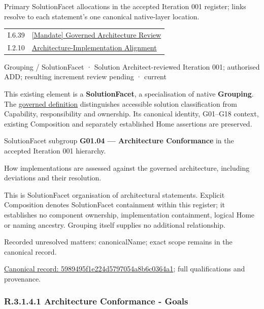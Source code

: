 Primary SolutionFacet allocations in the accepted Iteration 001 register; links resolve to each statement’s one canonical native-layer location.\par
\begin{longtable}{p{.22\linewidth}p{.73\linewidth}}
I.6.39 & \hyperref[element:d30a62f256ae44599841362118a84ec8]{[Mandate] Governed Architecture Review} \\
I.2.10 & \hyperref[element:adf5bd2a409b44099253fbed486d736f]{Architecture-Implementation Alignment} \\
\end{longtable}
\label{element:5989495f1e224d5797054a8b6c0364a1}
{\small Grouping / SolutionFacet · Solution Architect-reviewed Iteration 001; authorised ADD; resulting increment review pending · current}\par

This existing element is a \textbf{SolutionFacet}, a specialisation of native
\textbf{Grouping}. The \href{\detokenize{../../../../../../../governance/continuum-representation.md#solutionfacet-classification--1119-candidate}}{governed definition}
distinguishes accessible solution classification from Capability, responsibility
and ownership. Its canonical identity, G01–G18 context, existing Composition
and separately established Home assertions are preserved.



SolutionFacet subgroup \textbf{G01.04 — Architecture Conformance} in the accepted Iteration 001 hierarchy.



How implementations are assessed against the governed architecture, including deviations and their resolution.



This is SolutionFacet organisation of architectural statements. Explicit Composition denotes SolutionFacet containment within this register; it establishes no component ownership, implementation containment, logical Home or naming ancestry. Grouping itself supplies no additional relationship.


{\small Recorded unresolved matters: canonicalName; exact scope remains in the canonical record.}\par
{\footnotesize \href{../../../../../../../continuum/grouping/5989495f1e224d5797054a8b6c0364a1.md}{Canonical record: 5989495f1e224d5797054a8b6c0364a1}; full qualifications and provenance.}\par
\subsubsection*{R.3.1.4.1 Architecture Conformance - Goals}
\label{navigation:R.3.1.4.1}

